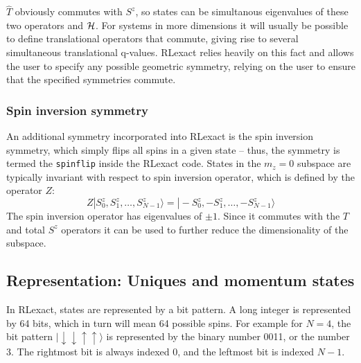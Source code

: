 \documentclass{article}
\begin{document}
$\hat{T}$ obviously commutes with $S^z$, so states can be simultanous eigenvalues of these two operators and ${\cal H}$. For systems in more dimensions it will usually be possible to define translational operators that commute, giving rise to several simultaneous translational q-values. RLexact relies heavily on this fact and allows the user to specify any possible geometric symmetry, relying on the user to ensure that the specified symmetries commute.

\subsubsection{Spin inversion symmetry}
An additional symmetry incorporated into RLexact is the spin inversion symmetry, which simply flips all spins in a given state -- thus, the symmetry is termed the \texttt{spinflip} inside the RLexact code. States in the $m_z=0$ subspace are typically invariant with respect to spin inversion operator, which is defined by the operator $Z$:
\begin{equation}
Z|S_0^z, S_1^z,\dots,S_{N-1}^z\rangle=|-S_0^z, -S_1^z,\dots,-S_{N-1}^z\rangle
\end{equation}
The spin inversion operator has eigenvalues of $\pm 1$. Since it commutes with the $T$ and total $S^z$ operators it can be used to further reduce the dimensionality of the subspace.

\subsection{Representation: Uniques and momentum states}
In RLexact, states are represented by a bit pattern. A long integer is represented by 64 bits, which in turn will mean 64 possible spins.
For example for $N=4$, the bit pattern $| \downarrow \downarrow \uparrow \uparrow \rangle$ is represented by the binary number 0011, or the number 3. The rightmost bit is always indexed 0, and the leftmost bit is indexed $N-1$.\\
\end{document}
